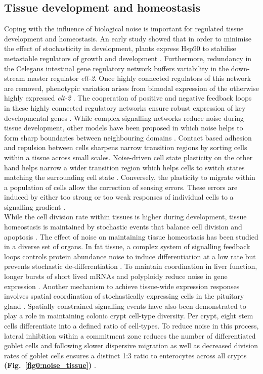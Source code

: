 \subsection{Tissue development and homeostasis}

Coping with the influence of biological noise is important for regulated tissue development and homeostasis. An early study showed that in order to minimise the effect of stochasticity in development, plants express \gls{Hsp90} to stabilise metastable regulators of growth and development \citep{Queitsch2002}. Furthermore, redundancy in the \Gls{Celegans} intestinal gene regulatory network buffers variability in the down-stream master regulator \textit{elt-2}. Once highly connected regulators of this network are removed, phenotypic variation arises from bimodal expression of the otherwise highly expressed \textit{elt-2} \citep{Raj2010}. The cooperation of positive and negative feedback loops in these highly connected regulatory networks ensure robust expression of key developmental genes \citep{Ji2013}. While complex signalling networks reduce noise during tissue development, other models have been proposed in which noise helps to form sharp boundaries between neighbouring domains \citep{Zhang2012}. Contact based adhesion and repulsion between cells sharpens narrow transition regions by sorting cells within a tissue across small scales. Noise-driven cell state plasticity on the other hand helps narrow a wider transition region which helps cells to switch states matching the surrounding cell state \citep{Wang2017}. Conversely, the plasticity to migrate within a population of cells allow the correction of sensing errors. These errors are induced by either too strong or too weak responses of individual cells to a signalling gradient \citep{Camley2017}.\\

While the cell division rate within tissues is higher during development, tissue homeostasis is maintained by stochastic events that balance cell division and apoptosis \citep{Ranft2010}. The effect of noise on maintaining tissue homeostasis has been studied in a diverse set of organs. In fat tissue, a complex system of signalling feedback loops controls protein abundance noise to induce differentiation at a low rate but prevents stochastic de-differentiation \citep{Ahrends2014}. To maintain coordination in liver function, longer bursts of short lived mRNAs and polyploidy reduce noise in gene expression \citep{BaharHalpern2015}. Another mechanism to achieve tissue-wide expression responses involves spatial coordination of stochastically expressing cells in the pituitary gland \citep{Featherstone2016}. Spatially constrained signalling events have also been demonstrated to play a role in maintaining colonic crypt cell-type diversity. Per crypt, eight stem cells differentiate into a defined ratio of cell-types. To reduce noise in this process, lateral inhibition within a commitment zone reduces the number of differentiated goblet cells and following slower dispersive migration as well as decreased division rates of goblet cells ensures a distinct 1:3 ratio to enterocytes across all crypts \textbf{(Fig.~\ref{fig0:noise_tissue})} \citep{Toth2017}.\\


